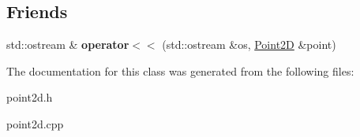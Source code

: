 \subsection*{Friends}
\begin{DoxyCompactItemize}
\item 
\mbox{\label{classPoint2D_a09b15e84ab259e853b28c2eb56b10713}} 
std\+::ostream \& {\bfseries operator$<$$<$} (std\+::ostream \&os, \hyperlink{classPoint2D}{Point2D} \&point)
\end{DoxyCompactItemize}


The documentation for this class was generated from the following files\+:\begin{DoxyCompactItemize}
\item 
point2d.\+h\item 
point2d.\+cpp\end{DoxyCompactItemize}
